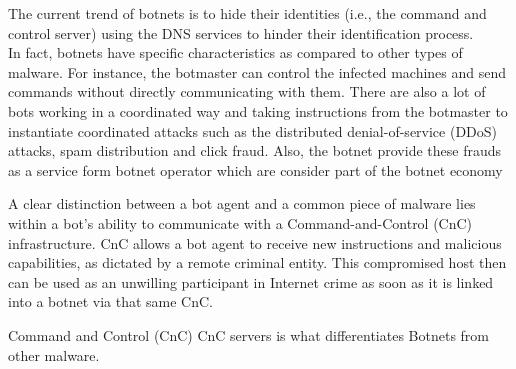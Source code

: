 The current trend of botnets is to hide their identities (i.e., the command and control server) using the DNS services to hinder their identification process.\\
In fact, botnets have specific characteristics as compared to other types of malware. For instance, the botmaster can control the infected machines and send commands without directly communicating with them. There are also a lot of bots working in a coordinated way and taking instructions from the botmaster to instantiate coordinated attacks such as the distributed denial-of-service
(DDoS) attacks, spam distribution and click fraud. %
Also, the botnet provide these frauds as a service form botnet operator which are consider part of the botnet economy

A clear distinction between a bot agent and a common piece of malware lies within a bot’s ability to communicate with a Command-and-Control (CnC) infrastructure. CnC allows a bot agent to receive new instructions and malicious capabilities, as dictated by a remote criminal entity. This compromised host then can be used as an unwilling participant in Internet crime as soon as it is linked into a botnet via that same CnC.

Command and Control (CnC) CnC servers is what differentiates Botnets from other malware.

